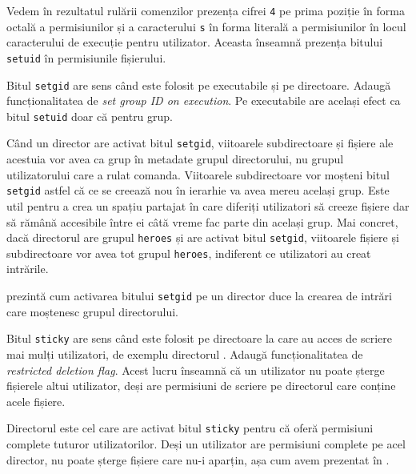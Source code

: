 Vedem în rezultatul rulării comenzilor prezența cifrei \texttt{4} pe prima poziție în forma octală a
permisiunilor și a caracterului \texttt{s} în forma literală a permisiunilor în locul
caracterului de execuție pentru utilizator. Aceasta înseamnă prezența bitului \texttt{setuid} în permisiunile fișierului.

Bitul \texttt{setgid} are sens când este folosit pe executabile și pe directoare. Adaugă
funcționalitatea de \textit{set group ID on execution}. Pe executabile are
același efect ca bitul \texttt{setuid} doar că pentru grup.

Când un director are activat bitul \texttt{setgid}, viitoarele subdirectoare și fișiere ale
acestuia vor avea ca grup în metadate grupul directorului, nu grupul
utilizatorului care a rulat comanda. Viitoarele subdirectoare vor moșteni bitul
\texttt{setgid} astfel că ce se creează nou în ierarhie va avea mereu același grup. Este
util pentru a crea un spațiu partajat în care diferiți utilizatori să creeze
fișiere dar să rămână accesibile între ei câtă vreme fac parte din același grup.
Mai concret, dacă directorul  are grupul \texttt{heroes} și are activat bitul
\texttt{setgid}, viitoarele fișiere și subdirectoare vor avea tot grupul \texttt{heroes},
indiferent ce utilizatori au creat intrările.

 prezintă cum activarea bitului \texttt{setgid} pe un director duce
la crearea de intrări care moștenesc grupul directorului.


Bitul \texttt{sticky} are sens când este folosit pe directoare la care au acces de
scriere mai mulți utilizatori, de exemplu directorul . Adaugă
funcționalitatea de \textit{restricted deletion flag}. Acest lucru înseamnă că un
utilizator nu poate șterge fișierele altui utilizator, deși are permisiuni de
scriere pe directorul care conține acele fișiere.

Directorul  este cel care are activat bitul \texttt{sticky} pentru că oferă
permisiuni complete tuturor utilizatorilor. Deși un utilizator are permisiuni
complete pe acel director, nu poate șterge fișiere care nu-i aparțin, așa cum
avem prezentat în .

